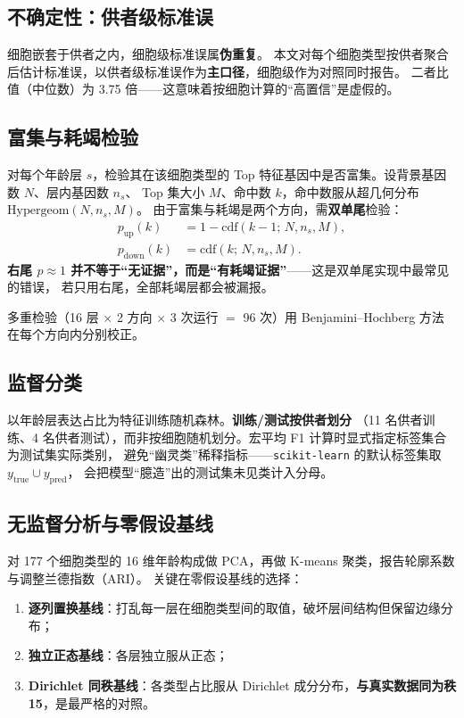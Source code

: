 \documentclass[UTF8, a4paper, 11pt]{ctexart}
\begin{document}
\subsection{不确定性：供者级标准误}

细胞嵌套于供者之内，细胞级标准误属\textbf{伪重复}\citep{hafemeister2019}。
本文对每个细胞类型按供者聚合后估计标准误，以供者级标准误作为\textbf{主口径}，细胞级作为对照同时报告。
二者比值（中位数）为 3.75 倍——这意味着按细胞计算的“高置信”是虚假的。

\subsection{富集与耗竭检验}

对每个年龄层 $s$，检验其在该细胞类型的 Top 特征基因中是否富集。设背景基因数 $N$、层内基因数 $n_s$、
Top 集大小 $M$、命中数 $k$，命中数服从超几何分布 $\mathrm{Hypergeom}(N, n_s, M)$。
由于富集与耗竭是两个方向，需\textbf{双单尾}检验：
\begin{align}
  p_{\text{up}}(k)   &= 1 - \mathrm{cdf}(k-1;\, N, n_s, M), \label{eq:pup}\\
  p_{\text{down}}(k) &= \mathrm{cdf}(k;\, N, n_s, M). \label{eq:pdown}
\end{align}
\textbf{右尾 $p \approx 1$ 并不等于“无证据”，而是“有耗竭证据”}——这是双单尾实现中最常见的错误，
若只用右尾，全部耗竭层都会被漏报。

多重检验（16 层 $\times$ 2 方向 $\times$ 3 次运行 $=$ 96 次）用 Benjamini--Hochberg 方法\citep{benjamini1995}
在每个方向内分别校正。

\subsection{监督分类}

以年龄层表达占比为特征训练随机森林\citep{breiman2001}。\textbf{训练/测试按供者划分}
（11 名供者训练、4 名供者测试），而非按细胞随机划分。宏平均 F1 计算时显式指定标签集合为测试集实际类别，
避免“幽灵类”稀释指标——\texttt{scikit-learn} 的默认标签集取 $y_{\text{true}} \cup y_{\text{pred}}$，
会把模型“臆造”出的测试集未见类计入分母。

\subsection{无监督分析与零假设基线}

对 177 个细胞类型的 16 维年龄构成做 PCA，再做 K-means 聚类，报告轮廓系数与调整兰德指数（ARI）\citep{mccune2002}。
关键在零假设基线的选择：
\begin{enumerate}[label=(\roman*)]
  \item \textbf{逐列置换基线}：打乱每一层在细胞类型间的取值，破坏层间结构但保留边缘分布；
  \item \textbf{独立正态基线}：各层独立服从正态；
  \item \textbf{Dirichlet 同秩基线}：各类型占比服从 Dirichlet 成分分布，\textbf{与真实数据同为秩 15}，是最严格的对照。
\end{enumerate}
\end{document}
